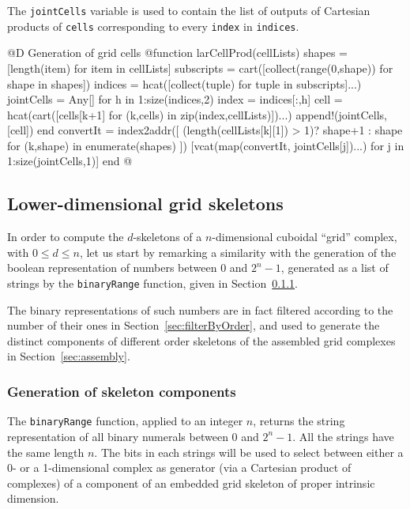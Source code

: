 The \texttt{jointCells} variable is used to contain the list of outputs of Cartesian products of \texttt{cells} corresponding to every \texttt{index} in \texttt{indices}.

@D Generation of grid cells 
@{function larCellProd(cellLists)
	shapes = [length(item) for item in cellLists]
	subscripts = cart([collect(range(0,shape)) for shape in shapes])
	indices = hcat([collect(tuple) for tuple in subscripts]...)
	jointCells = Any[]
	for h in 1:size(indices,2)
		index = indices[:,h]
		cell = hcat(cart([cells[k+1] for (k,cells) in zip(index,cellLists)])...)
		append!(jointCells,[cell])
	end
	convertIt = index2addr([ (length(cellLists[k][1]) > 1)? shape+1 : shape 
		for (k,shape) in enumerate(shapes) ])		
	[vcat(map(convertIt, jointCells[j])...) for j in 1:size(jointCells,1)]
end
@}



\subsection{Lower-dimensional grid skeletons}

In order to compute the $d$-skeletons of a $n$-dimensional cuboidal ``grid'' complex, with $0\leq d\leq n$, let us start by remarking a similarity with the generation of the boolean representation of numbers between 0 and $2^n -1$, generated as a list of strings by the \texttt{binaryRange} function, given in Section~\ref{sec:binaryRange}.

The binary representations of such numbers are in fact filtered according to the number of their ones in Section~\ref{sec:filterByOrder}, and used to generate the distinct components of different order skeletons of the assembled grid complexes in Section~\ref{sec:assembly}.

\subsubsection{Generation of skeleton components}
\label{sec:binaryRange}

The \texttt{binaryRange} function, applied to an integer $n$, returns the string representation of all binary numerals between 0 and $2^n -1$. All the strings have the same length $n$. The bits in each strings will be used to select between either a 0- or a 1-dimensional complex as generator (via a Cartesian product of complexes) of a component of an embedded grid skeleton of proper intrinsic dimension.

